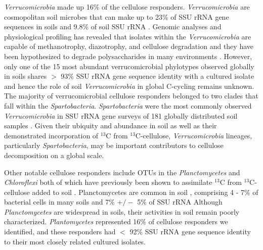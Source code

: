 \textit{Verrucomicrobia} made up 16\% of the cellulose responders.
\textit{Verrucomicrobia} are cosmopolitan soil microbes \citep{Bergmann_2011} that can make up
to 23\% of SSU rRNA gene sequences in soils \citep{Bergmann_2011} and 9.8\% of soil SSU rRNA
\citep{Buckley_2001}. Genomic analyses and physiological profiling has revealed that isolates
within the \textit{Verrucomicrobia} are capable of methanotrophy,
diazotrophy, and cellulose degradation \citep{Wertz_2011,Otsuka_2012} and they
have been hypothesized to degrade polysaccharides in many environments
\citep{Fierer_2013,10543821,Herlemann_2013}. However, only one of the
15 most abundant verrucomicrobial phylotypes observed globally in soils shares
$>$ 93\% SSU rRNA gene sequence identity with a cultured isolate \citep{Bergmann_2011} and hence
the role of soil \textit{Verrucomicrobia} in global C-cycling remains unknown.
The majority of verrucomicrobial cellulose responders belonged to two clades
that fall within the \textit{Spartobacteria}. \textit{Spartobacteria} were the
most commonly observed \textit{Verrucomicrobia} in SSU rRNA gene surveys of
181 globally distributed soil samples \citep{Bergmann_2011}. Given their ubiquity and abundance
in soil as well as their demonstrated incorporation of $^{13}$C from
$^{13}$C-cellulose, \textit{Verrucomicrobia} lineages, particularly
\textit{Spartobacteria}, may be important contributors to cellulose
decomposition on a global scale. 

Other notable cellulose responders include OTUs in the \textit{Planctomycetes}
and \textit{Chloroflexi} both of which have previously been shown to
assimilate $^{13}$C from $^{13}$C-cellulose added to soil
\citep{Schellenberger_2010}. Planctomycetes are common in soil
\citep{Jannsen2006}, comprising 4 - 7\% of bacterial cells in many soils
\citep{Zarda_1997,Chatzinotas_1998} and 7\% $+/-$ 5\% of SSU rRNA \citep{buckley_2003}       
Although \textit{Planctomycetes} are widespread in soils, their activities in
soil remain poorly characterized. \textit{Plantomycetes} represented 16\% of
cellulose responders we identified, and these responders had $<$ 92\% SSU rRNA
gene sequence identity to their most closely related cultured isolates.

